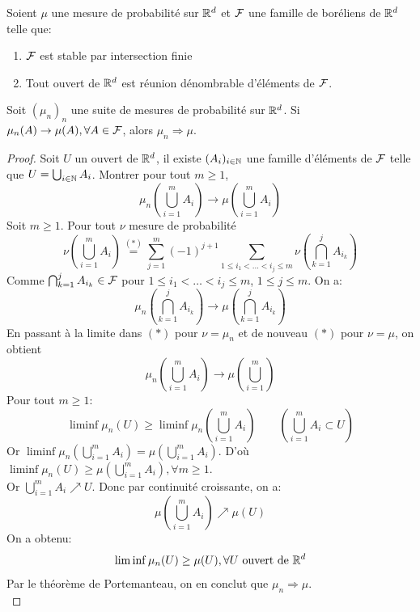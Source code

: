 \documentclass[]{report}
\begin{document}
    \begin{lm}{}{}
        Soient $\mu$ une mesure de probabilité sur $\mathbb{R}^d$ et $\mathcal{F}$ une famille de boréliens de $\mathbb{R}^d$ telle que:
        \begin{enumerate}
            \item $\mathcal{F}$ est stable par intersection finie
            \item Tout ouvert de $\mathbb{R}^d$ est réunion dénombrable d'éléments de $\mathcal{F}$.
        \end{enumerate}
        Soit $(\mu_n)_n$ une suite de mesures de probabilité sur $\mathbb{R}^d$. Si $\mu_n(A)\to \mu(A),\forall A\in \mathcal{F}$, alors $\mu_n\Longrightarrow \mu$.
    \end{lm}

    \begin{proof}
        Soit $U$ un ouvert de $\mathbb{R}^d$, il existe $(A_i)_{i\in \mathbb{N}}$ une famille d'éléments de $\mathcal{F}$ telle que $U=\bigcup_{i\in \mathbb{N}} A_i$. Montrer pour tout $m\ge 1$,
        \[\mu_n(\bigcup_{i=1}^m A_i)\longrightarrow \mu(\bigcup_{i=1}^m A_i)\]
        Soit $m\ge 1$. Pour tout $\nu$ mesure de probabilité
        \[\nu\left(\bigcup_{i=1}^m A_i\right)\overset{(*)}{=}\sum_{j=1}^{m}(-1)^{j+1}\sum_{1\le i_1<\ldots<i_j\le m}\nu(\bigcap_{k=1}^j A_{i_k})\]
        Comme $\bigcap_{k=1}^j A_{i_k} \in \mathcal{F}$ pour $1\le i_1<\ldots<i_j\le m$, $1\le j\le m$. On a:
        \[\mu_n\left(\bigcap_{k=1}^j A_{i_k}\right) \longrightarrow \mu(\bigcap_{k=1}^j A_{i_k})\]
        En passant à la limite dans $(*)$ pour $\nu =\mu_n$ et de nouveau $(*)$ pour $\nu=\mu$, on obtient
        \[\mu_n\left(\bigcup_{i=1}^{m} A_i \right)\longrightarrow \mu\left(\bigcup_{i=1}^m\right)\]
        Pour tout $m\ge 1$:
        \[\liminf \mu_n(U)\ge \liminf \mu_n\left(\bigcup_{i=1}^m A_i\right)\qquad \left(\bigcup_{i=1}^m A_i \subset U\right)\]
        Or $\liminf \mu_n\left(\bigcup_{i=1}^m A_i\right)=\mu\left(\bigcup_{i=1}^m A_i\right)$. D'où $\liminf \mu_n(U)\ge \mu\left(\bigcup_{i=1}^m A_i\right),\forall m\ge 1$.\\
        Or $\bigcup_{i=1}^m A_i\nearrow U$. Donc par continuité croissante, on a:
        \[\mu\left(\bigcup_{i=1}^m A_i\right)\nearrow \mu(U)\]
        On a obtenu:
        \[\liminf \mu_n(U)\ge \mu (U),\forall U\text{ ouvert de $\mathbb{R}^d$}\]
        Par le théorème de Portemanteau, on en conclut que $\mu_n\Longrightarrow \mu$.\\
    \end{proof}
\end{document}
